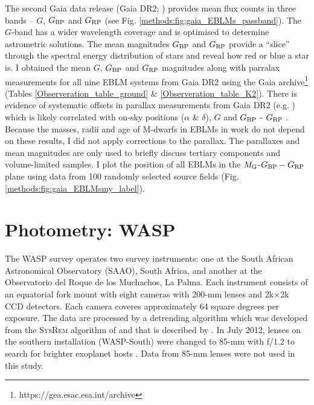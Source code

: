 
The second Gaia data release (Gaia DR2; \citealt{2018A&A...616A..10G}) provides mean flux counts in three bands -- $G$, $G_{\rm BP}$ and $G_{\rm RP}$ (see Fig. \ref{methods:fig:gaia_EBLMs_passband}). The $G$-band has a wider wavelength coverage and is optimised to determine astrometric solutions. The mean magnitudes $G_{\rm BP}$ and $G_{\rm RP}$ provide a ``slice'' through the spectral energy distribution of stars and reveal how red or blue a star is. I obtained the mean $G$, $G_{\rm BP}$ and $G_{\rm RP}$ magnitudes along with parralax measurements for all nine EBLM systems from Gaia DR2 using the Gaia archive\footnote{https://gea.esac.esa.int/archive} (Tables \ref{Observeration_table_ground} \& \ref{Observeration_table_K2}). There is evidence of systematic offsets in parallax measurements from Gaia DR2 (e.g. \citealt{2018ApJ...862...61S}) which is likely correlated with on-sky positions ($\alpha$ \& $\delta$), $G$ and $G_{\rm BP}$ - $G_{\rm RP}$ \citep{2018A&A...616A...2L}. Because the masses, radii and age of M-dwarfs in EBLMs in work do not depend on these results, I did not apply corrections to the parallax. The parallaxes and mean magnitudes are only used to briefly discuss tertiary components and volume-limited samples. I plot the position of all EBLMs in the $M_{\rm G}$-$G_{\rm BP}-G_{\rm RP}$ plane using data from 100 randomly selected source fields (Fig. \ref{methods:fig:gaia_EBLMsmy_label}). 

\section{Photometry: WASP}\label{WASP}

The WASP survey \citep{PollaccoSkillenCollierCameronEtAl2006} operates two survey instruments: one at the South African Astronomical Observatory (SAAO), South Africa, and another at the Observatorio del Roque de los Muchachos, La Palma.  Each instrument consists of an equatorial fork mount with eight cameras with 200-mm lenses and 2k$\times$2k CCD detectors. Each camera coveres approximately 64 square degrees per exposure. The data are processed by a detrending algorithm which was developed from the \textsc{SysRem} algorithm of \citet{2005MNRAS.356.1466T} and that is described by \citet{2007MNRAS.375..951C}. In July 2012, lenses on the southern installation (WASP-South) were changed to 85-mm with f/1.2 to search for brighter exoplanet hosts \citep{Smith2014}. Data from 85-mm lenses were not used in this study.

